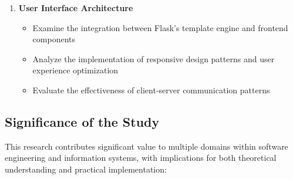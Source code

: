 \documentclass{article}
\begin{document}
\begin{enumerate}
    \item \textbf{User Interface Architecture}
    \begin{itemize}
        \item Examine the integration between Flask's template engine and 
              frontend components
        \item Analyze the implementation of responsive design patterns and user 
              experience optimization
        \item Evaluate the effectiveness of client-server communication patterns
    \end{itemize}
\end{enumerate}

\subsection{Significance of the Study}

This research contributes significant value to multiple domains within software engineering and information systems, with implications for both theoretical understanding and practical implementation:
\end{document}
